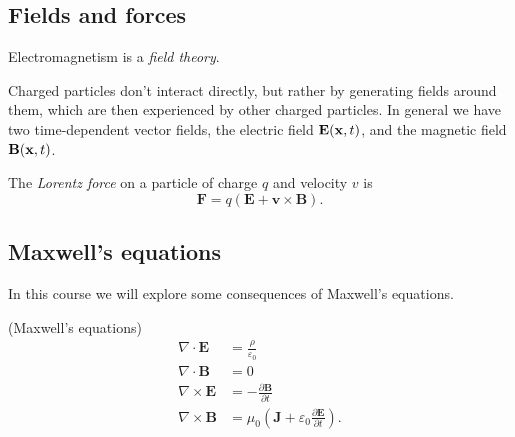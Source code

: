 \documentclass{article}
\begin{document}
\subsection{Fields and forces}
Electromagnetism is a \textit{field theory}.\par
Charged particles don't interact directly, but rather by generating fields around them, which are then experienced by other charged particles. In general we have two time-dependent vector fields, the electric field $ \mathbf E(\mathbf{x},t) $, and the magnetic field $ \mathbf B(\mathbf{x},t) $.\par
The \textit{Lorentz force} on a particle of charge $ q $ and velocity $ v $ is
\[
  \mathbf F=q(\mathbf E+\mathbf v\times \mathbf B).
\]
\subsection{Maxwell's equations}
In this course we will explore some consequences of Maxwell's equations.\begin{definition}
	(Maxwell's equations)
	\begin{align*}
		\nabla \cdot \mathbf E&=\frac{\rho}{\varepsilon_0}\\
		\nabla\cdot \mathbf B &= 0 \\
		\nabla\times \mathbf E &= -\frac{\partial \mathbf B}{\partial t} \\
		\nabla \times  \mathbf B &= \mu_0\left(\mathbf J + \varepsilon_0\frac{\partial \mathbf E}{\partial t}\right).
	\end{align*}
\end{definition}
\end{document}
